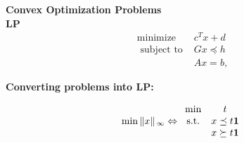 {\LARGE \textbf{Convex Optimization Problems}}\\

{\large \textbf{LP}}
$$
\begin{array}{ll}
\operatorname{minimize} & c^{T} x+d \\
\text { subject to } & G x \preceq h \\
& A x=b,
\end{array}
$$

\textbf{Converting problems into LP:}


\[\min \left\| x\right\|{_\infty } \Leftrightarrow \begin{array}{*{20}{c}}
{\min }&t\\
{{\rm{s}}{\rm{.t}}{\rm{.}}}&{x \preceq t\mathbf{1}}\\
{}&{x \succeq t\mathbf{1}}
\end{array}\]


